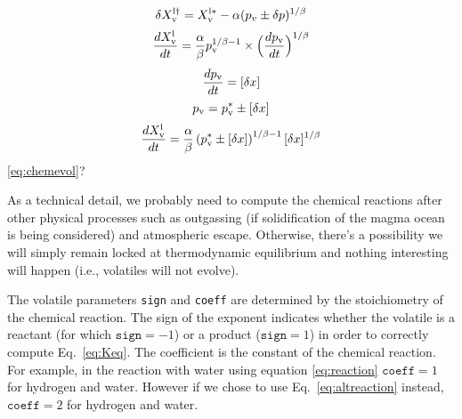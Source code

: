 \begin{equation}  
    \delta X_{\rm v}^{\rm l\dagger}  = X_{\rm v}^{\rm l \ast} - \alpha(p_v\pm\delta p)^{1/\beta} 
\end{equation}
\begin{equation}
    \frac{d  X_{\rm v}^{\rm l}}{dt} = \frac{\alpha}{\beta}p_{\rm v}^{1/\beta -1} \times \Big(\frac{dp_{\rm v}}{dt} \Big)^{1/\beta }
\end{equation}
\begin{equation}
    \frac{dp_{\rm v}}{dt} = [\delta x]
\end{equation}
\begin{equation}
    p_{\rm v}=p_{\rm v}^\ast \pm [\delta x]
\end{equation}
\begin{equation}
     \frac{d  X_{\rm v}^{\rm l}}{dt} = \frac{\alpha}{\beta}\left( p_{\rm v}^\ast \pm [\delta x] \right)^{1/\beta -1} [\delta x]^{1/\beta}
\end{equation}
 \ref{eq:chemevol}? 

As a technical detail, we probably need to compute the chemical reactions after other physical processes such as outgassing (if solidification of the magma ocean is being considered) and atmospheric escape.  Otherwise, there's a possibility we will simply remain locked at thermodynamic equilibrium and nothing interesting will happen (i.e., volatiles will not evolve).   

The volatile parameters \texttt{sign} and \texttt{coeff} are determined by the stoichiometry of the chemical reaction. The sign of the exponent indicates whether the volatile is a reactant (for which $\texttt{sign}=-1$) or a product ($\texttt{sign}=1$) in order to correctly compute Eq.~\ref{eq:Keq}. The coefficient is the constant of the chemical reaction. For example, in the reaction with water using equation \ref{eq:reaction} $\texttt{coeff}=1$ for hydrogen and water. However if we chose to use Eq.~\ref{eq:altreaction} instead, $\texttt{coeff}=2$ for hydrogen and water. 

